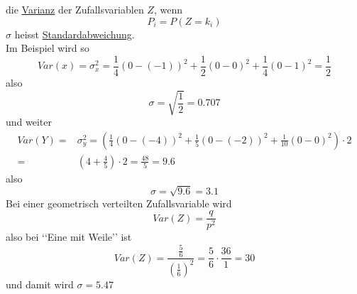 \documentclass{report}
\begin{document}
die \underline{Varianz} der Zufallsvariablen $Z$, wenn
\begin{equation}
P_i = P(Z=k_i)
\end{equation}
$\sigma$ heisst \underline{Standardabweichung}.\\
Im Beispiel wird so
\begin{equation}
Var(x) = \sigma_x^2 = \frac{1}{4}(0-(-1))^2 + \frac{1}{2}(0-0)^2 + \frac{1}{4}(0-1)^2 = \frac{1}{2}
\end{equation}
also
\begin{equation}
\sigma = \sqrt{\frac{1}{2}} = 0.707
\end{equation}
und weiter
\begin{align*}
Var(Y) = & \sigma^2_y = (\frac{1}{4}(0-(-4))^2 + \frac{1}{5}(0-(-2))^2 + \frac{1}{10}(0-0)^2) \cdot 2\\
= & (4 + \frac{4}{5}) \cdot 2 = \frac{48}{5} = 9.6
\end{align*}
also
\begin{equation}
\sigma = \sqrt{9.6} = 3.1
\end{equation}
Bei einer geometrisch verteilten Zufallsvariable wird
\begin{equation}
Var(Z) = \frac{q}{p^2}
\end{equation}
also bei \lq\lq{}Eine mit Weile\rq\rq{} ist
\begin{equation}
Var(Z) = \frac{\frac{5}{6}}{(\frac{1}{6})^2} = \frac{5}{6} \cdot \frac{36}{1} = 30
\end{equation}
und damit wird $\sigma = 5.47$
\end{document}
